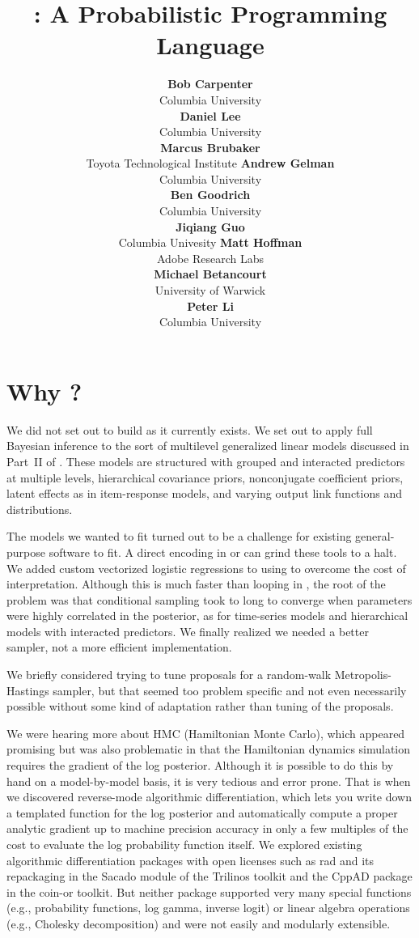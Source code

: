 \documentclass[article]{jss}
\author{{\bf\large Bob Carpenter}
        \\ Columbia University
        \\[9pt]
        {\bf\large Daniel Lee}
        \\ Columbia University
        \\[9pt]
        {\bf\large Marcus Brubaker}
        \\ Toyota Technological Institute
    \And
        {\bf\large Andrew Gelman}
        \\ Columbia University
        \\[9pt]
        {\bf\large Ben Goodrich}
        \\ Columbia University
        \\[9pt]
        {\bf\large Jiqiang Guo}
        \\ Columbia Univesity
     \And
        {\bf\large Matt Hoffman}
        \\ Adobe Research Labs
        \\[9pt]
        {\bf\large Michael Betancourt}
        \\ University of Warwick
        \\[9pt]
        {\bf\large Peter Li}
        \\ Columbia University
}
\title{\proglang{Stan}: A Probabilistic Programming Language}
\begin{document}

\section[Why Stan?]{Why ?}

We did not set out to build  as it currently exists.
We set out to apply full Bayesian inference to the sort of multilevel
generalized linear models discussed in Part~II of
\citep{GelmanHill:2007}.  These models are structured with grouped and
interacted predictors at multiple levels, hierarchical covariance
priors, nonconjugate coefficient priors, latent effects as in
item-response models, and varying output link functions and
distributions.

The models we wanted to fit turned out to be a challenge for existing
general-purpose software to fit.  A direct encoding in 
or  can grind these tools to a halt.  We added custom
vectorized logistic regressions to  using
 to overcome the cost of interpretation.  Although this
is much faster than looping in , the root of the
problem was that conditional sampling took to long to converge when
parameters were highly correlated in the posterior, as for time-series
models and hierarchical models with interacted predictors.  We finally
realized we needed a better sampler, not a more efficient
implementation.

We briefly considered trying to tune proposals for a random-walk
Metropolis-Hastings sampler, but that seemed too problem specific and
not even necessarily possible without some kind of adaptation rather
than tuning of the proposals. 

We were hearing more about HMC (Hamiltonian Monte Carlo), which
appeared promising but was also problematic in that the Hamiltonian
dynamics simulation requires the gradient of the log posterior.
Although it is possible to do this by hand on a model-by-model basis,
it is very tedious and error prone.  That is when we discovered
reverse-mode algorithmic differentiation, which lets you write down a
templated  function for the log posterior and
automatically compute a proper analytic gradient up to machine
precision accuracy in only a few multiples of the cost to evaluate the
log probability function itself.  We explored existing algorithmic
differentiation packages with open licenses such as {\sc rad}
\citep{Gay:2005} and its repackaging in the Sacado module of the
Trilinos toolkit and the {\small CppAD} package in the {\sc coin-or}
toolkit.  But neither package supported very many special functions
(e.g., probability functions, log gamma, inverse logit) or linear
algebra operations (e.g., Cholesky decomposition) and were not easily
and modularly extensible.
\end{document}
